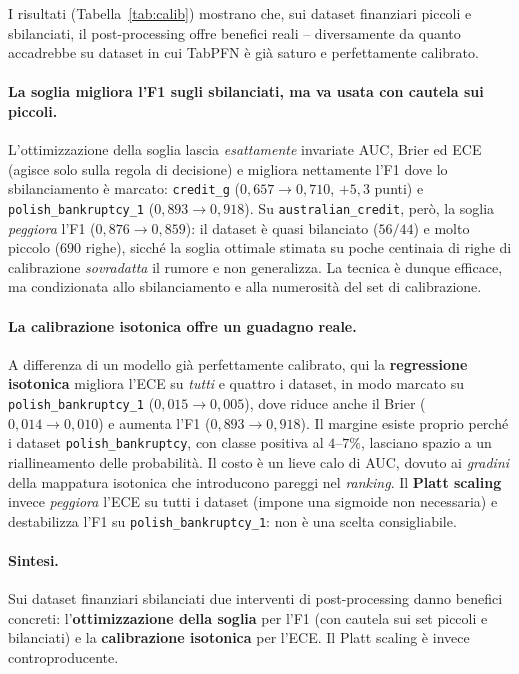 \documentclass[11pt,a4paper]{article}
\begin{document}
I risultati (Tabella~\ref{tab:calib}) mostrano che, sui dataset finanziari
piccoli e sbilanciati, il post-processing offre benefici reali -- diversamente da
quanto accadrebbe su dataset in cui TabPFN è già saturo e perfettamente
calibrato.

\paragraph{La soglia migliora l'F1 sugli sbilanciati, ma va usata con cautela sui
piccoli.} L'ottimizzazione della soglia lascia \emph{esattamente} invariate AUC,
Brier ed ECE (agisce solo sulla regola di decisione) e migliora nettamente l'F1
dove lo sbilanciamento è marcato: \texttt{credit\_g} ($0{,}657 \to 0{,}710$,
$+5{,}3$ punti) e \texttt{polish\_bankruptcy\_1} ($0{,}893 \to 0{,}918$). Su
\texttt{australian\_credit}, però, la soglia \emph{peggiora} l'F1
($0{,}876 \to 0{,}859$): il dataset è quasi bilanciato ($56/44$) e molto piccolo
($690$ righe), sicché la soglia ottimale stimata su poche centinaia di righe di
calibrazione \emph{sovradatta} il rumore e non generalizza. La tecnica è dunque
efficace, ma condizionata allo sbilanciamento e alla numerosità del set di
calibrazione.

\paragraph{La calibrazione isotonica offre un guadagno reale.} A differenza di un
modello già perfettamente calibrato, qui la \textbf{regressione isotonica}
migliora l'ECE su \emph{tutti} e quattro i dataset, in modo marcato su
\texttt{polish\_bankruptcy\_1} ($0{,}015 \to 0{,}005$), dove riduce anche il Brier
($0{,}014 \to 0{,}010$) e aumenta l'F1 ($0{,}893 \to 0{,}918$). Il margine esiste
proprio perché i dataset \texttt{polish\_bankruptcy}, con classe positiva al
$4$--$7\%$, lasciano spazio a un riallineamento delle probabilità. Il costo è un
lieve calo di AUC, dovuto ai \emph{gradini} della mappatura isotonica che
introducono pareggi nel \emph{ranking}. Il \textbf{Platt scaling} invece
\emph{peggiora} l'ECE su tutti i dataset (impone una sigmoide non necessaria) e
destabilizza l'F1 su \texttt{polish\_bankruptcy\_1}: non è una scelta
consigliabile.

\paragraph{Sintesi.} Sui dataset finanziari sbilanciati due interventi di
post-processing danno benefici concreti: l'\textbf{ottimizzazione della soglia}
per l'F1 (con cautela sui set piccoli e bilanciati) e la \textbf{calibrazione
isotonica} per l'ECE. Il Platt scaling è invece controproducente.
\end{document}
